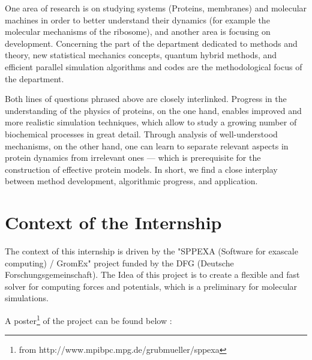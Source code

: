\documentclass[12pt,twoside,a4paper]{report}
\begin{document}
One area of research is on studying systems (Proteins, membranes) and molecular machines in order to better understand their dynamics (for example the molecular mechanisms of the ribosome), and another area is focusing on development.
Concerning the part of the department dedicated to methods and theory, new statistical mechanics concepts, quantum hybrid methods, and efficient parallel simulation algorithms and codes are the methodological focus of the department.

Both lines of questions phrased above are closely interlinked. Progress in the understanding of the physics of proteins, on the one hand, enables improved and more realistic simulation techniques, which allow to study a growing number of biochemical processes in great detail. Through analysis of well-understood mechanisms, on the other hand, one can learn to separate relevant aspects in protein dynamics from irrelevant ones — which is prerequisite for the construction of effective protein models. In short, we find a close interplay between method development, algorithmic progress, and application.  






\chapter{Context of the Internship}

The context of this internship is driven by the "SPPEXA (Software for exascale computing) / GromEx" project funded by the DFG (Deutsche Forschungsgemeinschaft).
The Idea of this project is to create a flexible and fast solver for computing forces and potentials, which is a preliminary for molecular simulations.

A poster\footnote{from http://www.mpibpc.mpg.de/grubmueller/sppexa}   of the project can be found below :
\end{document}
